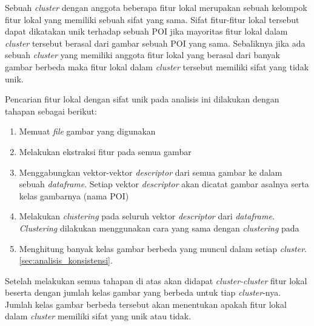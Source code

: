 Sebuah \textit{cluster} dengan anggota beberapa fitur lokal merupakan sebuah kelompok fitur lokal yang memiliki sebuah sifat yang sama. Sifat fitur-fitur lokal tersebut dapat dikatakan unik terhadap sebuah POI jika mayoritas fitur lokal dalam \textit{cluster} tersebut berasal dari gambar sebuah POI yang sama. Sebaliknya jika ada sebuah \textit{cluster} yang memiliki anggota fitur lokal yang berasal dari banyak gambar berbeda maka fitur lokal dalam \textit{cluster} tersebut memiliki sifat yang tidak unik.

Pencarian fitur lokal dengan sifat unik pada analisis ini dilakukan dengan tahapan sebagai berikut:
\begin{enumerate}
	\item Memuat \textit{file} gambar yang digunakan
	\item Melakukan ekstraksi fitur pada semua gambar
	\item Menggabungkan vektor-vektor \textit{descriptor} dari semua gambar ke dalam sebuah \textit{dataframe}. Setiap vektor \textit{descriptor} akan dicatat gambar asalnya serta kelas gambarnya (nama POI)
	\item Melakukan \textit{clustering} pada seluruh vektor \textit{descriptor} dari \textit{dataframe}. \textit{Clustering} dilakukan menggunakan cara yang sama dengan \textit{clustering} pada 
	\item Menghitung banyak kelas gambar berbeda yang muncul dalam setiap \textit{cluster}. \ref{sec:analisis_konsistensi}.
\end{enumerate}
Setelah melakukan semua tahapan di atas akan didapat \textit{cluster-cluster} fitur lokal beserta dengan jumlah kelas gambar yang berbeda untuk tiap \textit{cluster}-nya. Jumlah kelas gambar berbeda tersebut akan menentukan apakah fitur lokal dalam \textit{cluster} memiliki sifat yang unik atau tidak. 

